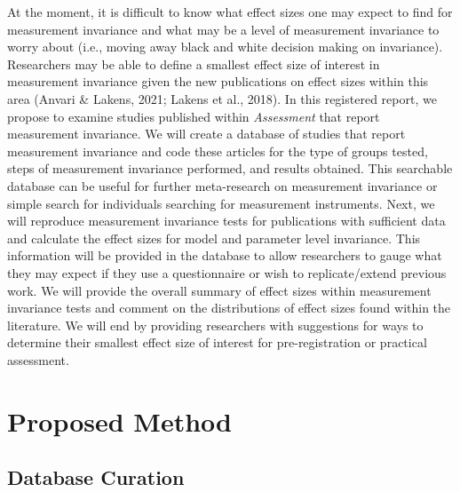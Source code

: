 \documentclass[
  man]{apa7}
\begin{document}
At the moment, it is difficult to know what effect sizes one may expect to find for measurement invariance and what may be a level of measurement invariance to worry about (i.e., moving away black and white decision making on invariance). Researchers may be able to define a smallest effect size of interest in measurement invariance given the new publications on effect sizes within this area (Anvari \& Lakens, 2021; Lakens et al., 2018). In this registered report, we propose to examine studies published within \emph{Assessment} that report measurement invariance. We will create a database of studies that report measurement invariance and code these articles for the type of groups tested, steps of measurement invariance performed, and results obtained. This searchable database can be useful for further meta-research on measurement invariance or simple search for individuals searching for measurement instruments. Next, we will reproduce measurement invariance tests for publications with sufficient data and calculate the effect sizes for model and parameter level invariance. This information will be provided in the database to allow researchers to gauge what they may expect if they use a questionnaire or wish to replicate/extend previous work. We will provide the overall summary of effect sizes within measurement invariance tests and comment on the distributions of effect sizes found within the literature. We will end by providing researchers with suggestions for ways to determine their smallest effect size of interest for pre-registration or practical assessment.

\section{Proposed Method}\label{proposed-method}

\subsection{Database Curation}\label{database-curation}
\end{document}
